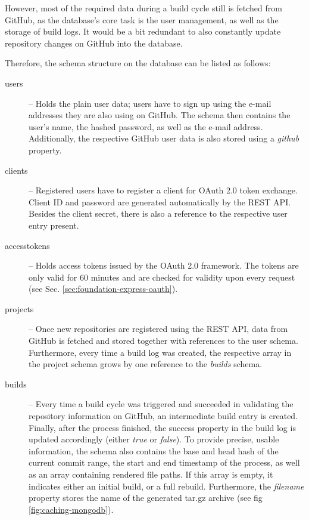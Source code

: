 However, most of the required data during a build cycle still is fetched from GitHub, as the database's core task is the user management, as well as the storage of build logs. It would be a bit redundant to also constantly update repository changes on GitHub into the database.

Therefore, the schema structure on the database can be listed as follows:

\begin{description}
  \item[users] -- Holds the plain user data; users have to sign up using the e-mail addresses they are also using on GitHub. The schema then contains the user's name, the hashed password, as well as the e-mail address. Additionally, the respective GitHub user data is also stored using a \emph{github} property.
  \item[clients] -- Registered users have to register a client for OAuth 2.0 token exchange. Client ID and password are generated automatically by the REST API. Besides the client secret, there is also a reference to the respective user entry present.
  \item[accesstokens] -- Holds access tokens issued by the OAuth 2.0 framework. The tokens are only valid for 60 minutes and are checked for validity upon every request (see Sec. \ref{sec:foundation-express-oauth}).
  \item[projects] -- Once new repositories are registered using the REST API, data from GitHub is fetched and stored together with references to the user schema. Furthermore, every time a build log was created, the respective array in the project schema grows by one reference to the \emph{builds} schema.
  \item[builds] -- Every time a build cycle was triggered and succeeded in validating the repository information on GitHub, an intermediate build entry is created. Finally, after the process finished, the success property in the build log is updated accordingly (either \emph{true} or \emph{false}). To provide precise, usable information, the schema also contains the base and head hash of the current commit range, the start and end timestamp of the process, as well as an array containing rendered file paths. If this array is empty, it indicates either an initial build, or a full rebuild. Furthermore, the \emph{filename} property stores the name of the generated tar.gz archive (see fig \ref{fig:caching-mongodb}).
\end{description}
